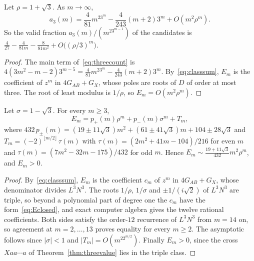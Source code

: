 \begin{corollary}[asymptotics]\label{cor:threeasymp}
Let $\rho=1+\sqrt3$. As $m\to\infty$,
\begin{equation}\label{eq:asymp1}
a_3(m)=\frac4{81}m^23^m-\frac4{243}(m+2)3^m+O(m^2\rho^m).
\end{equation}
So the valid fraction $a_3(m)/(m^23^{m-1})$ of the candidates is
$\frac4{27}-\frac4{81m}-\frac8{81m^2}+O\bigl((\rho/3)^m\bigr)$.
\end{corollary}

\begin{proof}
The main term of~\eqref{eq:threecount} is
$4(3m^2-m-2)3^{m-5}=\frac4{81}m^23^m-\frac4{243}(m+2)3^m$. By~\eqref{eq:classsum}, $E_m$ is the coefficient of $z^m$ in $4G_{AB}+G_X$, whose poles are roots of $D$ of order at
most three. The root of least modulus is $1/\rho$, so $E_m=O(m^2\rho^m)$.
\end{proof}

\begin{theorem}\label{thm:threeclosed}
Let $\sigma=1-\sqrt3$. For every $m\ge3$,
\begin{equation}\label{eq:Eclosed}
E_m=p_+(m)\rho^m+p_-(m)\sigma^m+T_m,
\end{equation}
where $432\,p_\pm(m)=(19\pm11\sqrt3)m^2+(61\pm41\sqrt3)m+104\pm28\sqrt3$ and $T_m=(-2)^{\lfloor m/2\rfloor}\,\tau(m)$ with $\tau(m)=(2m^2+41m-104)/216$ for even $m$ and
$\tau(m)=(7m^2-32m-175)/432$ for odd $m$. Hence $E_m\sim\frac{19+11\sqrt3}{432}m^2\rho^m$, and $E_m>0$.
\end{theorem}

\begin{proof}
By~\eqref{eq:classsum}, $E_m$ is the coefficient $c_m$ of $z^m$ in $4G_{AB}+G_X$, whose
denominator divides $L^3N^3$. The roots $1/\rho$, $1/\sigma$
and $\pm1/(i\sqrt2)$ of $L^3N^3$ are triple, so beyond a polynomial part of degree one the
$c_m$ have the form~\eqref{eq:Eclosed}, and exact computer algebra gives the
twelve rational coefficients. Both sides satisfy the order-$12$ recurrence of $L^3N^3$
from $m=14$ on, so agreement at $m=2,\dots,13$ proves equality for every $m\ge2$. The asymptotic follows since $|\sigma|<1$
and $|T_m|=O(m^22^{m/2})$. Finally $E_m>0$, since the cross $Xaa\cdots a$ of
Theorem~\ref{thm:threevalue} lies in the triple class.
\end{proof}

